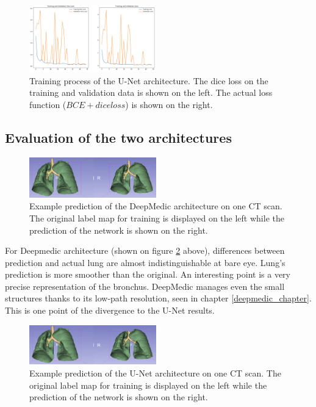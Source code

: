 \begin{figure}[h!]
	\includegraphics[width=0.49\textwidth, angle=0]{files/jpgunettrain.png}
	\caption{Training process of the U-Net architecture. The dice loss on the training and validation data is shown on the left. The actual loss function ($BCE + dice loss$) is shown on the right.}
	\label{train_unet}
\end{figure}

\subsection{Evaluation of the two architectures}

\begin{figure}[h!]
	\includegraphics[width=0.49\textwidth, angle=0]{files/preddeepmedic.png}
	\caption{Example prediction of the DeepMedic architecture on one CT scan. The original label map for training is displayed on the left while the prediction of the network is shown on the right.}
	\label{pred_deepmedic}
\end{figure}

For Deepmedic architecture (shown on figure \ref{pred_deepmedic} above), differences between prediction and actual lung are almost indistinguishable at bare eye. Lung's prediction is more smoother than the original. An interesting point is a very precise representation of the bronchus. DeepMedic manages even the small structures thanks to its low-path resolution, seen in chapter \ref{deepmedic_chapter}. This is one point of the divergence to the U-Net results.\newline

\begin{figure}[h!]
	\includegraphics[width=0.49\textwidth, angle=0]{files/predunet.png}
	\caption{Example prediction of the U-Net architecture on one CT scan. The original label map for training is displayed on the left while the prediction of the network is shown on the right.}
	\label{pred_unet}
\end{figure}

